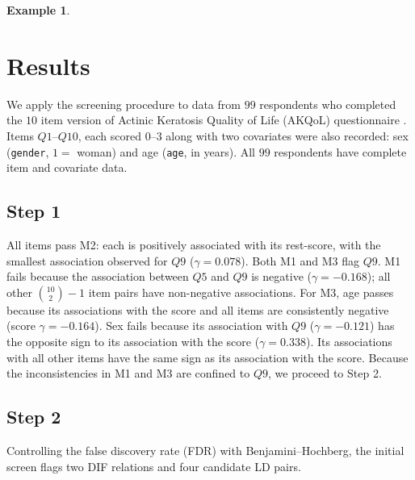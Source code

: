\documentclass[12pt]{article}
\theoremstyle{examplestyle}
\newtheorem{example}{Example}[section]
\begin{document}
\begin{mybox3}
\begin{example}
\begin{center}
\end{center}
    \end{example}
\end{mybox3}



\section{Results}

We apply the screening procedure to data from $99$ respondents who completed the $10$ item version of Actinic Keratosis Quality of Life (AKQoL) questionnaire \cite{Esmann-2013}. Items $Q1$--$Q10$, each scored $0$--$3$ along with two covariates were also recorded: sex (\texttt{gender}, $1=$ woman) and age (\texttt{age}, in years). All $99$ respondents have complete item and covariate data.

\subsection{Step 1}
All items pass M2: each is positively associated with its rest-score, with the smallest association observed for $Q9$ ($\gamma=0.078$). Both M1 and M3 flag $Q9$. M1 fails because the association between $Q5$ and $Q9$ is negative ($\gamma=-0.168$); all other $\binom{10}{2}-1$ item pairs have non-negative associations. For M3, age passes because its associations with the score and all items are consistently negative (score $\gamma=-0.164$). Sex fails because its association with $Q9$ ($\gamma=-0.121$) has the opposite sign to its association with the score ($\gamma=0.338$). Its associations with all other items have the same sign as its association with the score. Because the inconsistencies in M1 and M3 are confined to $Q9$, we proceed to Step 2.

\subsection{Step 2}
Controlling the false discovery rate (FDR) with Benjamini--Hochberg, the initial screen flags two DIF relations and four candidate LD pairs.
\end{document}
